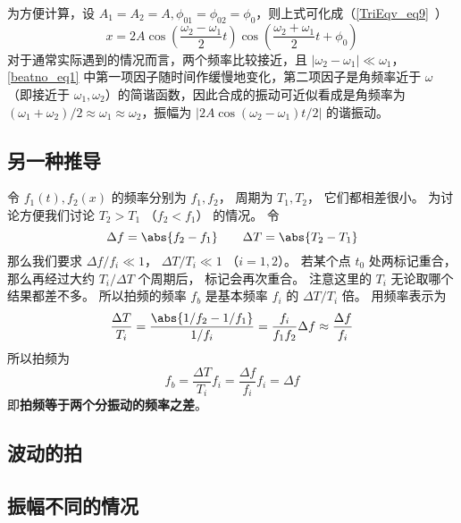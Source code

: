 为方便计算，设 $A_1=A_2=A,\phi_{01}=\phi_{02}=\phi_{0}$，则上式可化成（\autoref{TriEqv_eq9}~）
\begin{equation} \label{beatno_eq1}
x=2 A \cos \left(\frac{\omega_{2}-\omega_{1}}{2} t\right) \cos \left(\frac{\omega_{2}+\omega_{1}}{2} t+\phi_{0}\right)
\end{equation}
对于通常实际遇到的情况而言，两个频率比较接近，且 $\left|\omega_{2}-\omega_{1}\right|\ll \omega_1$，\autoref{beatno_eq1} 中第一项因子随时间作缓慢地变化，第二项因子是角频率近于 $\omega$（即接近于 $\omega_1,\omega_2$）的简谐函数，因此合成的振动可近似看成是角频率为 $(\omega_{1}+\omega_{2})/2 \approx \omega_{1} \approx \omega_{2}$，振幅为 $\left | 2 A \cos (\omega_{2}-\omega_{1})t/{2} \right |$ 的谐振动。

\subsection{另一种推导}

令 $f_1(t), f_2(x)$ 的频率分别为 $f_1, f_2$， 周期为 $T_1, T_2$， 它们都相差很小。 为讨论方便我们讨论 $T_2 > T_1$ （$f_2 < f_1$） 的情况。 令
\begin{equation}
\Delta f = \abs{f_2 - f_1}
\qquad
\Delta T = \abs{T_2 - T_1}
\end{equation}
那么我们要求 $\Delta f/f_i \ll 1$， $\Delta T/T_i \ll 1$ （$i = 1,2$）。 若某个点 $t_0$ 处两标记重合， 那么再经过大约 $T_i/\Delta T$ 个周期后， 标记会再次重合。 注意这里的 $T_i$ 无论取哪个结果都差不多。 所以拍频的频率 $f_b$ 是基本频率 $f_i$ 的 $\Delta T/T_i$ 倍。 用频率表示为
\begin{equation}
\frac{\Delta T}{T_i} = \frac{\abs{1/f_2 - 1/f_1}}{1/f_i} = \frac{f_i}{f_1 f_2} \Delta f \approx \frac{\Delta f}{f_i}
\end{equation}
所以拍频为
\begin{equation}
f_b = \frac{\Delta T}{T_i}f_i = \frac{\Delta f}{f_i} f_i = \Delta f
\end{equation}
即\textbf{拍频等于两个分振动的频率之差}。

\subsection{波动的拍}

\subsection{振幅不同的情况}
